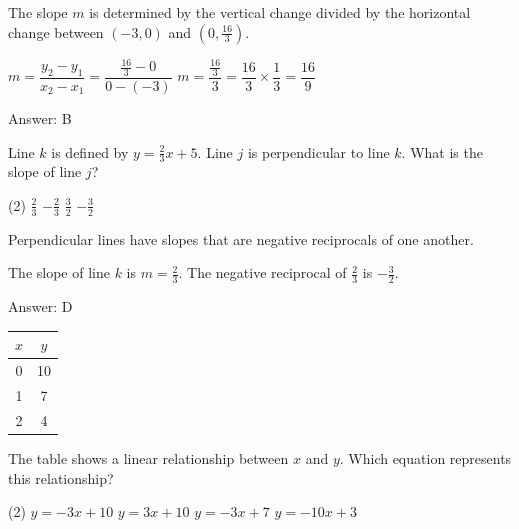 \documentclass[11pt,paper=a4,answers]{exam}
\begin{document}
\begin{questions}
\begin{solution}
The slope $m$ is determined by the vertical change divided by the horizontal change between $(-3, 0)$ and $(0, \frac{16}{3})$.
\vspace{5pt}
\begin{center}
$m = \dfrac{y_2 - y_1}{x_2 - x_1} = \dfrac{\frac{16}{3} - 0}{0 - (-3)}$
\vspace{5pt}
$m = \dfrac{\frac{16}{3}}{3} = \dfrac{16}{3} \times \dfrac{1}{3} = \dfrac{16}{9}$
\end{center}
\vspace{5pt}
Answer: \colorbox{yellow!100}{B}
\end{solution}

\vspace{1cm}

\question
Line $k$ is defined by $y = \frac{2}{3}x + 5$. Line $j$ is perpendicular to line $k$. What is the slope of line $j$?
\begin{tasks}(2)
\task $\frac{2}{3}$
\task $-\frac{2}{3}$
\task $\frac{3}{2}$
\task $-\frac{3}{2}$
\end{tasks}

\begin{solution}
Perpendicular lines have slopes that are negative reciprocals of one another.
\vspace{5pt}
\begin{center}
The slope of line $k$ is $m = \frac{2}{3}$.
\vspace{5pt}
The negative reciprocal of $\frac{2}{3}$ is $-\frac{3}{2}$.
\end{center}
\vspace{5pt}
Answer: \colorbox{yellow!100}{D}
\end{solution}

\vspace{1cm}

\question
\begin{center}
\begin{tabular}{|c|c|}
\hline
$x$ & $y$ \\ \hline
0 & 10 \\ \hline
1 & 7 \\ \hline
2 & 4 \\ \hline
\end{tabular}
\end{center}
The table shows a linear relationship between $x$ and $y$. Which equation represents this relationship?
\begin{tasks}(2)
\task $y = -3x + 10$
\task $y = 3x + 10$
\task $y = -3x + 7$
\task $y = -10x + 3$
\end{tasks}


\end{questions}
\end{document}
